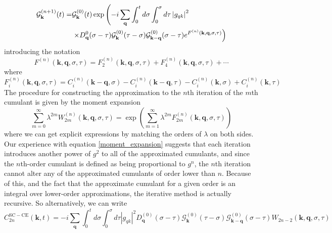 \begin{align}
    \mathcal{G}_{\mathbf{k}}^{(n+1)}(t)= & \mathcal{G}_{\mathbf{k}}^{(0)}(t) \exp \left(-i \sum_{\mathbf{q}} \int_0^t d \sigma \int_0^\sigma d \tau\left|g_{q k}\right|^2\right. \\
& \left.\times D_{\mathbf{q}}^0(\sigma-\tau) \mathcal{G}_{\mathbf{k}}^{(0)}(\tau-\sigma) \mathcal{G}_{\mathbf{k}-\mathbf{q}}^{(0)}(\sigma-\tau) e^{F^{(n)}(\mathbf{k}, \mathbf{q}, \sigma, \tau)}\right) \notag
\end{align}
introducing the notation 
\begin{equation}
    F^{(n)}(\mathbf{k}, \mathbf{q}, \sigma, \tau) = F_2^{(n)}(\mathbf{k}, \mathbf{q}, \sigma, \tau)+F_4^{(n)}(\mathbf{k}, \mathbf{q}, \sigma, \tau)+\cdots
\end{equation}
where
\begin{equation}
    F_i^{(n)}(\mathbf{k}, \mathbf{q}, \sigma, \tau) = C_i^{(n)}(\mathbf{k}-\mathbf{q}, \sigma)-C_i^{(n)}(\mathbf{k}-\mathbf{q}, \tau) -C_i^{(n)}(\mathbf{k}, \sigma)+C_i^{(n)}(\mathbf{k}, \tau)
\end{equation}
The procedure for constructing the approximation to the $n$th iteration of the $m$th cumulant is given by the moment expansion
\begin{equation}
    \sum_{m=0}^{\infty} \lambda^{2 m} W_{2 m}^{(n)}(\mathbf{k}, \mathbf{q}, \sigma, \tau)=\exp \left(\sum_{m=1}^{\infty} \lambda^{2 m} F_{2 m}^{(n)}(\mathbf{k}, \mathbf{q}, \sigma, \tau)\right)
\end{equation}
where we can get explicit expressions by matching the orders of $\lambda$ on both sides.
Our experience with equation \eqref{moment_expansion} suggests that each iteration introduces another power of $g^2$ to all of the approximated cumulants, and since the $n$th-order cumulant is defined as being proportional to $g^n$, the $n$th iteration cannot alter any of the approximated cumulants of order lower than $n$. Because of this, and the fact that the approximate cumulant for a given order is an integral over lower-order approximations, the iterative method is actually recursive. So alternatively, we can write
\begin{equation}
    C_{2 n}^{\mathrm{SC}-\mathrm{CE}}(\mathbf{k}, t)= -i \sum_{\mathbf{q}} \int_0^t d \sigma \int_0^\sigma d \tau\left|g_{q k}\right|^2 D_{\mathbf{q}}^{(0)}(\sigma-\tau) \mathcal{G}_{\mathbf{k}}^{(0)}(\tau-\sigma) \mathcal{G}_{\mathbf{k}-\mathbf{q}}^{(0)}(\sigma-\tau) W_{2 n-2}(\mathbf{k}, \mathbf{q}, \sigma, \tau)
\end{equation}
